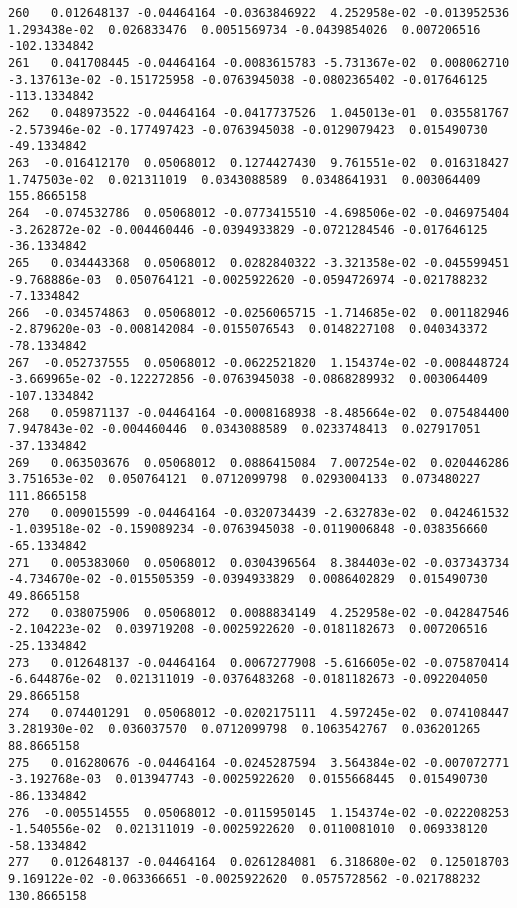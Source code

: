 \documentclass[15pt,a4paper,openright]{article}
\begin{document}
\begin{lstlisting}[language=AMPL, caption = data file]
260   0.012648137 -0.04464164 -0.0363846922  4.252958e-02 -0.013952536  1.293438e-02  0.026833476  0.0051569734 -0.0439854026  0.007206516 -102.1334842
261   0.041708445 -0.04464164 -0.0083615783 -5.731367e-02  0.008062710 -3.137613e-02 -0.151725958 -0.0763945038 -0.0802365402 -0.017646125 -113.1334842
262   0.048973522 -0.04464164 -0.0417737526  1.045013e-01  0.035581767 -2.573946e-02 -0.177497423 -0.0763945038 -0.0129079423  0.015490730  -49.1334842
263  -0.016412170  0.05068012  0.1274427430  9.761551e-02  0.016318427  1.747503e-02  0.021311019  0.0343088589  0.0348641931  0.003064409  155.8665158
264  -0.074532786  0.05068012 -0.0773415510 -4.698506e-02 -0.046975404 -3.262872e-02 -0.004460446 -0.0394933829 -0.0721284546 -0.017646125  -36.1334842
265   0.034443368  0.05068012  0.0282840322 -3.321358e-02 -0.045599451 -9.768886e-03  0.050764121 -0.0025922620 -0.0594726974 -0.021788232   -7.1334842
266  -0.034574863  0.05068012 -0.0256065715 -1.714685e-02  0.001182946 -2.879620e-03 -0.008142084 -0.0155076543  0.0148227108  0.040343372  -78.1334842
267  -0.052737555  0.05068012 -0.0622521820  1.154374e-02 -0.008448724 -3.669965e-02 -0.122272856 -0.0763945038 -0.0868289932  0.003064409 -107.1334842
268   0.059871137 -0.04464164 -0.0008168938 -8.485664e-02  0.075484400  7.947843e-02 -0.004460446  0.0343088589  0.0233748413  0.027917051  -37.1334842
269   0.063503676  0.05068012  0.0886415084  7.007254e-02  0.020446286  3.751653e-02  0.050764121  0.0712099798  0.0293004133  0.073480227  111.8665158
270   0.009015599 -0.04464164 -0.0320734439 -2.632783e-02  0.042461532 -1.039518e-02 -0.159089234 -0.0763945038 -0.0119006848 -0.038356660  -65.1334842
271   0.005383060  0.05068012  0.0304396564  8.384403e-02 -0.037343734 -4.734670e-02 -0.015505359 -0.0394933829  0.0086402829  0.015490730   49.8665158
272   0.038075906  0.05068012  0.0088834149  4.252958e-02 -0.042847546 -2.104223e-02  0.039719208 -0.0025922620 -0.0181182673  0.007206516  -25.1334842
273   0.012648137 -0.04464164  0.0067277908 -5.616605e-02 -0.075870414 -6.644876e-02  0.021311019 -0.0376483268 -0.0181182673 -0.092204050   29.8665158
274   0.074401291  0.05068012 -0.0202175111  4.597245e-02  0.074108447  3.281930e-02  0.036037570  0.0712099798  0.1063542767  0.036201265   88.8665158
275   0.016280676 -0.04464164 -0.0245287594  3.564384e-02 -0.007072771 -3.192768e-03  0.013947743 -0.0025922620  0.0155668445  0.015490730  -86.1334842
276  -0.005514555  0.05068012 -0.0115950145  1.154374e-02 -0.022208253 -1.540556e-02  0.021311019 -0.0025922620  0.0110081010  0.069338120  -58.1334842
277   0.012648137 -0.04464164  0.0261284081  6.318680e-02  0.125018703  9.169122e-02 -0.063366651 -0.0025922620  0.0575728562 -0.021788232  130.8665158

\end{lstlisting}
\end{document}
